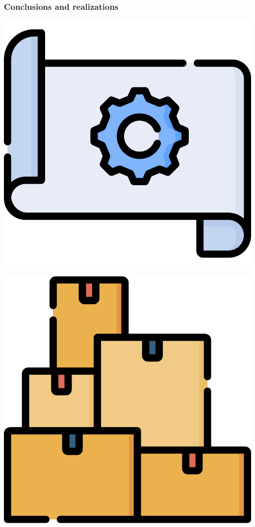 \documentclass[xcolor=svgnames,10pt,aspectratio=1610]{beamer}
\begin{document}
\begin{frame}
  \frametitle{Conclusions and realizations}
  \centering
  \begin{minipage}{.7\textwidth}
    \hspace{-0.3cm}
    \begin{minipage}{0.05\textwidth}
      \includegraphics[width=\textwidth]{img/plan.pdf}
    \end{minipage}
    \begin{minipage}{0.05\textwidth}
      \includegraphics[width=\textwidth]{img/boxes.pdf}

\end{minipage}
\end{minipage}
\end{frame}
\end{document}
